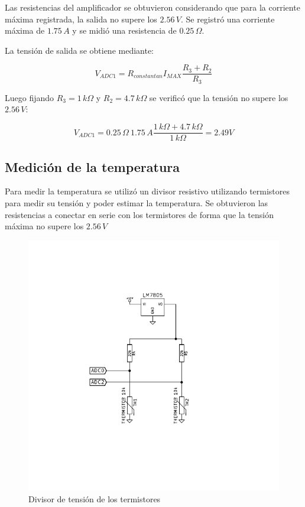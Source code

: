 \documentclass[10pt,spanish,a4paper,openany,notitlepage]{article}
\begin{document}
Las resistencias del amplificador se obtuvieron considerando que para
la corriente máxima registrada, la salida no supere los $2.56\, \unit{V}$.
Se registró una corriente máxima de $1.75\, \unit{A}$ y se midió una
resistencia de $0.25\, \unit{\Omega}$.

La tensión de salida se obtiene mediante:

\begin{equation}
V_{ADC1} = R_{constantan} I_{MAX} \frac{R_3 + R_2}{R_3}
\label{eq:tension_salida}
\end{equation}

Luego fijando $R_3 = 1\, \unit{k\Omega}$ y $R_2 = 4.7\, \unit{k\Omega}$
se verificó que la tensión no supere los $2.56\, \unit{V}$:

\[ \displaystyle V_{ADC1} = 0.25\, \unit{\Omega}\ 1.75\, \unit{A} \frac{1\, \unit{k\Omega} + 4.7\, \unit{k\Omega}}{1\, \unit{k\Omega}} = 2.49 \unit{V} \]

\subsection{Medición de la temperatura}

Para medir la temperatura se utilizó un divisor resistivo
utilizando termistores para medir su tensión y poder estimar la temperatura.
Se obtuvieron las resistencias a conectar en serie con los termistores de
forma que la tensión máxima no supere los $2.56\, \unit{V}$

\begin{figure}[H] %
\begin{center}
\includegraphics[scale=1]{../circuitos/temperatura.pdf}
\caption{Divisor de tensión de los termistores}
 \label{fig:temperatura}
\end{center}
\end{figure}
\end{document}
